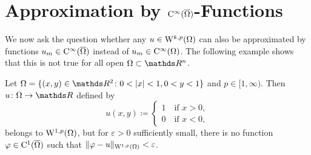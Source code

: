 \section{Approximation by \texorpdfstring{$\mathrm{C}^\infty(\overline{\Omega})$}{C\textasciicircum infty(Omega) }-Functions}

We now ask the question whether any $u \in \mathrm{W}^{k,p}(\Omega)$ can also be approximated by functions $u_m \in \mathrm{C}^\infty(\overline\Omega)$ instead of $u_m \in \mathrm{C}^\infty(\Omega)$.
The following example shows that this is not true for all open $\Omega \subset \R^n$.

\begin{ex}[Exercise]
  \label{ex:noSegmentCondition}
  Let $\Omega = \{(x,y) \in \R^2 \colon 0 < |x| < 1, 0 < y < 1\}$ and $p \in [1,\infty)$.
  Then $u \colon \Omega \to \R$ defined by
  $$
  u(x,y) \coloneqq \begin{cases} 1 \quad\text{if } x > 0,\\ 0 \quad\text{if } x < 0, \end{cases}
  $$
  belongs to $\mathrm{W}^{1,p}(\Omega)$, but for $\varepsilon > 0$ sufficiently small, there is no function $\varphi \in \mathrm{C}^1(\overline\Omega)$ such that $\|\varphi - u\|_{\mathrm{W}^{1,p}(\Omega)} < \varepsilon$. 
  

\end{ex}
